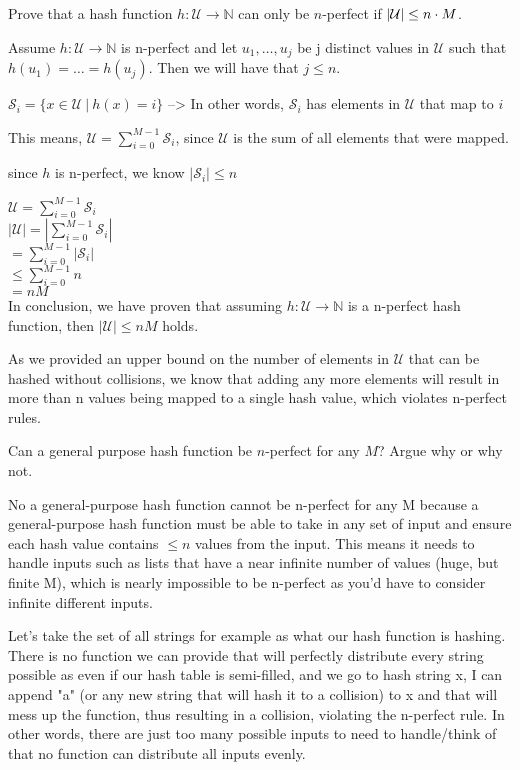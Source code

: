 \begin{problem}
\begin{questions}
\item Prove that a hash function $h : \mathcal{U} \rightarrow \mathbb{N}$ can only be $n$-perfect if $\lvert \mathcal{U} \rvert \leq n \cdot M$.

Assume $h : \mathcal{U} \rightarrow \mathbb{N}$ is n-perfect and let 
$u_1, \dots, u_j$ be j distinct values in $\mathcal{U}$ such that $h(u_1) = \dots = h(u_j)$. Then we will have that $j \leq n$.

$\mathcal{S}_i = \{x \in \mathcal{U}\:|\:h(x) = i\}$ --> In other words, $\mathcal{S}_i$ has elements in $\mathcal{U}$ that map to $i$

This means, $\mathcal{U} = \sum_{i=0}^{M-1} \mathcal{S}_i$, since $\mathcal{U}$ is the sum of all elements that were mapped.

since $h$ is n-perfect, we know $|\mathcal{S}_i| \leq n$

$\mathcal{U} = \sum_{i=0}^{M-1} \mathcal{S}_i$\\
$|\mathcal{U}| = |\sum_{i=0}^{M-1} \mathcal{S}_i|$\\
$ = \sum_{i=0}^{M-1} |\mathcal{S}_i|$\\
$ \leq \sum_{i=0}^{M-1} n$\\
$ = nM $\\

In conclusion, we have proven that assuming $h : \mathcal{U} \rightarrow \mathbb{N}$ is a n-perfect hash function, then $|\mathcal{U}| \leq nM$ holds.

As we provided an upper bound on the number of elements in $\mathcal{U}$ that can be hashed without collisions, we know that adding any more elements will result in more than n values being mapped to a single hash value, which violates n-perfect rules.

\item Can a general purpose hash function be $n$-perfect for any $M$? Argue why or why not.

No a general-purpose hash function cannot be n-perfect for any M because a general-purpose hash function must be able to take in any set of input and ensure each hash value contains $\leq n$ values from the input. 
This means it needs to handle inputs such as lists that have a near infinite number of values (huge, but finite M), which is nearly impossible to be n-perfect as you'd have to consider infinite different inputs.

Let's take the set of all strings for example as what our hash function is hashing. There is no function we can provide that will perfectly distribute every string possible as even if our hash table is semi-filled, and we go to hash string x, I can append "a" (or any new string that will hash it to a collision) to x and that will mess up the function, thus resulting in a collision, violating the n-perfect rule. In other words, there are just too many possible inputs to need to handle/think of that no function can distribute all inputs evenly.


\end{questions}
\end{problem}

